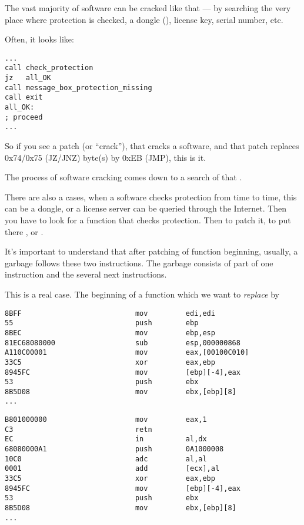 \label{\SoftwareCracking}

The vast majority of software can be cracked like that --- by searching the very place where protection is checked, a dongle
(), license key, serial number, etc.

Often, it looks like:

\begin{lstlisting}[style=customasmx86]
...
call check_protection
jz   all_OK
call message_box_protection_missing
call exit
all_OK:
; proceed
...
\end{lstlisting}

So if you see a patch (or ``crack''), that cracks a software, and that patch replaces 0x74/0x75 (JZ/JNZ) byte(s) by 0xEB (JMP),
this is it.

The process of software cracking comes down to a search of that .

\myhrule{}

There are also a cases, when a software checks protection from time to time, this can be a dongle, or a license server
can be queried through the Internet.
Then you have to look for a function that checks protection.
Then to patch it, to put there , or .

It's important to understand that after patching of function beginning, usually, a garbage follows these two instructions.
The garbage consists of part of one instruction and the several next instructions.

This is a real case.
The beginning of a function which we want to \emph{replace} by 

\begin{lstlisting}[style=customasmx86,caption=Before]
8BFF                           mov         edi,edi
55                             push        ebp
8BEC                           mov         ebp,esp
81EC68080000                   sub         esp,000000868
A110C00001                     mov         eax,[00100C010]
33C5                           xor         eax,ebp
8945FC                         mov         [ebp][-4],eax
53                             push        ebx
8B5D08                         mov         ebx,[ebp][8]
...
\end{lstlisting}

\begin{lstlisting}[style=customasmx86,caption=After]
B801000000                     mov         eax,1
C3                             retn
EC                             in          al,dx
68080000A1                     push        0A1000008
10C0                           adc         al,al
0001                           add         [ecx],al
33C5                           xor         eax,ebp
8945FC                         mov         [ebp][-4],eax
53                             push        ebx
8B5D08                         mov         ebx,[ebp][8]
...
\end{lstlisting}

